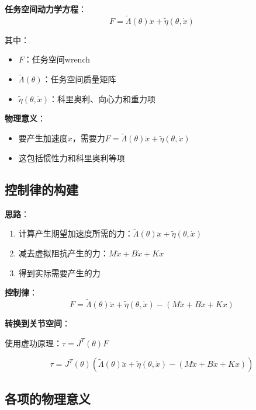 \documentclass[12pt,a4paper]{article}
\begin{document}
\textbf{任务空间动力学方程}：
\begin{equation}
F = \tilde{\Lambda}(\theta)\ddot{x} + \tilde{\eta}(\theta, \dot{x}) \tag{*}
\end{equation}

其中：
\begin{itemize}
\item $F$：任务空间wrench
\item $\tilde{\Lambda}(\theta)$：任务空间质量矩阵
\item $\tilde{\eta}(\theta, \dot{x})$：科里奥利、向心力和重力项
\end{itemize}

\textbf{物理意义}：
\begin{itemize}
\item 要产生加速度$\ddot{x}$，需要力$F = \tilde{\Lambda}(\theta)\ddot{x} + \tilde{\eta}(\theta, \dot{x})$
\item 这包括惯性力和科里奥利等项
\end{itemize}

\subsection{控制律的构建}

\textbf{思路}：
\begin{enumerate}
\item 计算产生期望加速度所需的力：$\tilde{\Lambda}(\theta)\ddot{x} + \tilde{\eta}(\theta, \dot{x})$
\item 减去虚拟阻抗产生的力：$M\ddot{x} + B\dot{x} + Kx$
\item 得到实际需要产生的力
\end{enumerate}

\textbf{控制律}：
\begin{equation}
F = \tilde{\Lambda}(\theta)\ddot{x} + \tilde{\eta}(\theta, \dot{x}) - (M\ddot{x} + B\dot{x} + Kx) \tag{11.65-task}
\end{equation}

\textbf{转换到关节空间}：

使用虚功原理：$\tau = J^T(\theta)F$

\begin{equation}
\tau = J^T(\theta)\left(\tilde{\Lambda}(\theta)\ddot{x} + \tilde{\eta}(\theta, \dot{x}) - (M\ddot{x} + B\dot{x} + Kx)\right) \tag{11.65}
\end{equation}

\subsection{各项的物理意义}
\end{document}

